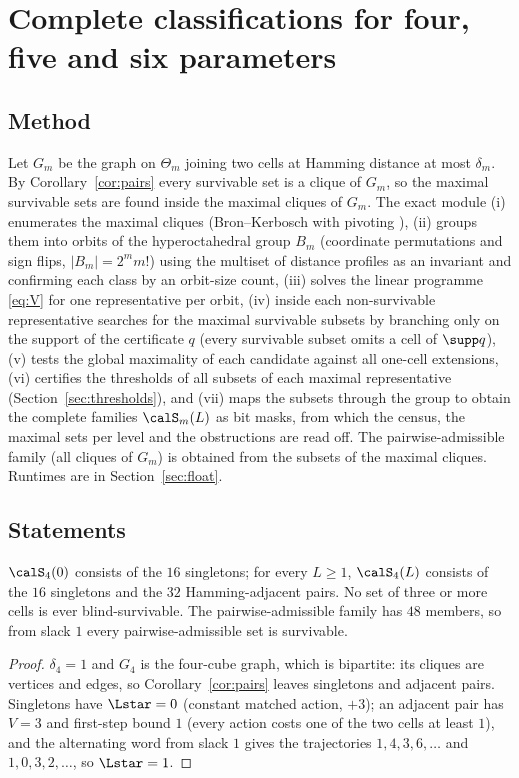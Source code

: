\section{Complete classifications for four, five and six parameters}\label{sec:classification}

\subsection{Method}
Let $G_m$ be the graph on $\Theta_m$ joining two cells at Hamming distance at most $\delta_m$. By Corollary~\ref{cor:pairs} every survivable set is a clique of $G_m$, so the maximal survivable sets are found inside the maximal cliques of $G_m$. The exact module (i) enumerates the maximal cliques (Bron--Kerbosch with pivoting \cite{BronKerbosch1973}), (ii) groups them into orbits of the hyperoctahedral group $B_m$ (coordinate permutations and sign flips, $|B_m|=2^mm!$) using the multiset of distance profiles as an invariant and confirming each class by an orbit-size count, (iii) solves the linear programme \eqref{eq:V} for one representative per orbit, (iv) inside each non-survivable representative searches for the maximal survivable subsets by branching only on the support of the certificate $q$ (every survivable subset omits a cell of $\supp q$), (v) tests the global maximality of each candidate against all one-cell extensions, (vi) certifies the thresholds of all subsets of each maximal representative (Section~\ref{sec:thresholds}), and (vii) maps the subsets through the group to obtain the complete families $\calS_m(L)$ as bit masks, from which the census, the maximal sets per level and the obstructions are read off. The pairwise-admissible family (all cliques of $G_m$) is obtained from the subsets of the maximal cliques. Runtimes are in Section~\ref{sec:float}.

\subsection{Statements}
\begin{theorem}\label{thm:m4}
$\calS_4(0)$ consists of the $16$ singletons; for every $L\ge1$, $\calS_4(L)$ consists of the $16$ singletons and the $32$ Hamming-adjacent pairs. No set of three or more cells is ever blind-survivable. The pairwise-admissible family has $48$ members, so from slack $1$ every pairwise-admissible set is survivable.
\end{theorem}
\begin{proof}
$\delta_4=1$ and $G_4$ is the four-cube graph, which is bipartite: its cliques are vertices and edges, so Corollary~\ref{cor:pairs} leaves singletons and adjacent pairs. Singletons have $\Lstar=0$ (constant matched action, $+3$); an adjacent pair has $V=3$ and first-step bound $1$ (every action costs one of the two cells at least $1$), and the alternating word from slack $1$ gives the trajectories $1,4,3,6,\dots$ and $1,0,3,2,\dots$, so $\Lstar=1$.
\end{proof}

